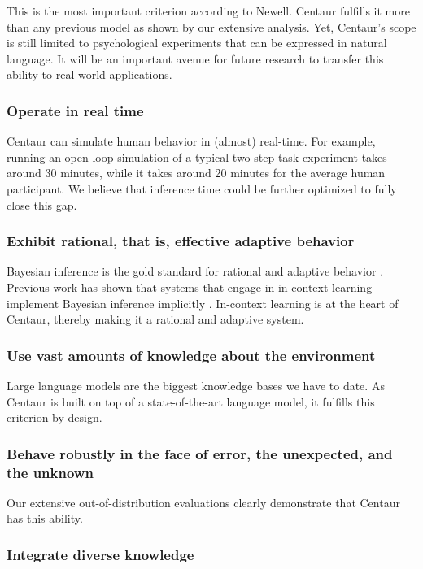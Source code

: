 \documentclass[pdflatex,sn-nature]{sn-jnl}%
\theoremstyle{thmstyleone}%
\theoremstyle{thmstyletwo}%
\theoremstyle{thmstylethree}%
\begin{document}
This is the most important criterion according to Newell. Centaur fulfills it more than any previous model as shown by our extensive analysis. Yet, Centaur's scope is still limited to psychological experiments that can be expressed in natural language. It will be an important avenue for future research to transfer this ability to real-world applications.

\subsubsection*{Operate in real time}

Centaur can simulate human behavior in (almost) real-time. For example, running an open-loop simulation of a typical two-step task experiment takes around 30 minutes, while it takes around 20 minutes for the average human participant. We believe that inference time could be further optimized to fully close this gap.

\subsubsection*{Exhibit rational, that is, effective adaptive behavior}

Bayesian inference is the gold standard for rational and adaptive behavior \cite{anderson90}. Previous work has shown that systems that engage in in-context learning implement Bayesian inference implicitly \cite{binz2023meta}. In-context learning is at the heart of Centaur, thereby making it a rational and adaptive system.

\subsubsection*{Use vast amounts of knowledge about the environment}

Large language models are the biggest knowledge bases we have to date. As Centaur is built on top of a state-of-the-art language model, it fulfills this criterion by design.

\subsubsection*{Behave robustly in the face of error, the unexpected, and the unknown}

Our extensive out-of-distribution evaluations clearly demonstrate that Centaur has this ability.

\subsubsection*{Integrate diverse knowledge}
\end{document}
